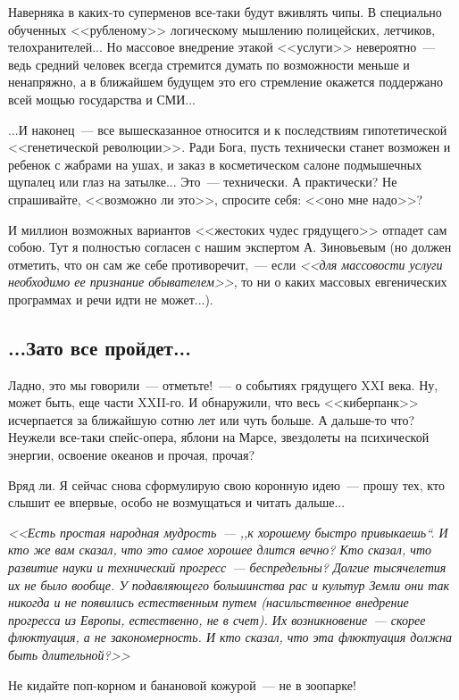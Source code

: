 \documentclass{scrbook}
\newcommand{\glqq}{,,}
\newcommand{\grqq}{``}
\newcommand{\flqq}{<<}
\newcommand{\frqq}{>>}
\newcommand{\mdash}{~--- }
\newcommand{\commamdash}{~--- } %
\newcommand{\essaysection}[1]{\subsection*{#1}\nopagebreak}
\begin{document}
Наверняка в каких-то суперменов все-таки будут вживлять чипы. В специально обученных {\flqq}рубленому{\frqq} логическому мышлению полицейских, летчиков, телохранителей... Но массовое внедрение этакой {\flqq}услуги{\frqq} невероятно{\mdash}ведь средний человек всегда стремится думать по возможности меньше и ненапряжно, а в ближайшем будущем это его стремление окажется поддержано всей мощью государства и СМИ...

...И наконец{\mdash}все вышесказанное относится и к последствиям гипотетической {\flqq}генетической революции{\frqq}. Ради Бога, пусть технически станет возможен и ребенок с жабрами на ушах, и заказ в косметическом салоне подмышечных щупалец или глаз на затылке... Это{\mdash}технически. А практически? Не спрашивайте, {\flqq}возможно ли это{\frqq}, спросите себя: {\flqq}оно мне надо{\frqq}?

И миллион возможных вариантов {\flqq}жестоких чудес грядущего{\frqq} отпадет сам собою. Тут я полностью согласен с нашим экспертом А. Зиновьевым (но должен отметить, что он сам же себе противоречит,{\commamdash}если \emph{{\flqq}для массовости услуги необходимо ее признание обывателем{\frqq}}, то ни о каких массовых евгенических программах и речи идти не может...).

\essaysection{...Зато все пройдет...}

Ладно, это мы говорили{\mdash}отметьте!{\mdash}о событиях грядущего XXI века. Ну, может быть, еще части XXII-го. И обнаружили, что весь {\flqq}киберпанк{\frqq} исчерпается за ближайшую сотню лет или чуть больше. А дальше-то что? Неужели все-таки спейс-опера, яблони на Марсе, звездолеты на психической энергии, освоение океанов и прочая, прочая?

Вряд ли. Я сейчас снова сформулирую свою коронную идею{\mdash}прошу тех, кто слышит ее впервые, особо не возмущаться и читать дальше...

\emph{{\flqq}Есть простая народная мудрость{\mdash}{\glqq}к хорошему быстро привыкаешь{\grqq}. И кто же вам сказал, что это самое хорошее длится вечно? Кто сказал, что развитие науки и технический прогресс{\mdash}беспредельны? Долгие тысячелетия их не было вообще. У подавляющего большинства рас и культур Земли они так никогда и не появились естественным путем (насильственное внедрение прогресса из Европы, естественно, не в счет). Их возникновение{\mdash}скорее флюктуация, а не закономерность. И кто сказал, что эта флюктуация должна быть длительной?{\frqq}}

Не кидайте поп-корном и банановой кожурой{\mdash}не в зоопарке!
\end{document}
